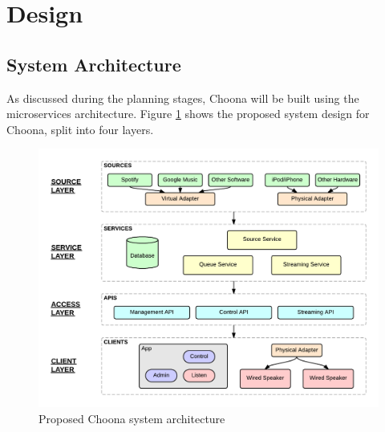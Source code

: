 \section{Design}

\subsection{System Architecture}

As discussed during the planning stages, Choona will be built using the microservices architecture. Figure \ref{fig:architecture} shows the proposed system design for Choona, split into four layers.

\begin{figure}[h!]
  \centering
  \includegraphics[width=1\textwidth]{./img/sys-architecture.png}
  \caption{Proposed Choona system architecture}
  \label{fig:architecture}
\end{figure}

